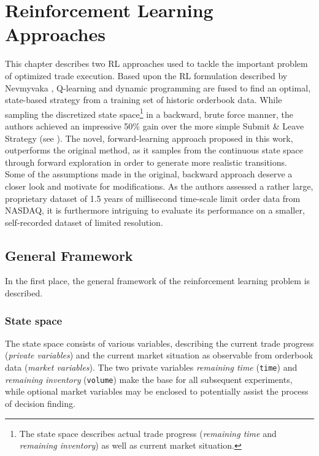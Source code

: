 \chapter{Reinforcement Learning Approaches}
\label{chap:reinforcementlearning}
This chapter describes two \ac{RL} approaches used to tackle the important problem of optimized trade execution. Based upon the \ac{RL} formulation described by Nevmyvaka \etal \cite{Nevmyvaka:2006}, Q-learning and dynamic programming are fused to find an optimal, state-based strategy from a training set of historic orderbook data. While sampling the discretized state space\footnote{The state space describes actual trade progress (\ie \emph{remaining time} and \emph{remaining inventory}) as well as current market situation.} in a backward, brute force manner, the authors achieved an impressive 50\% gain over the more simple Submit \& Leave Strategy (see ). The novel, forward-learning approach proposed in this work, outperforms the original method, as it samples from the continuous state space through forward exploration in order to generate more realistic transitions.\\

Some of the assumptions made in the original, backward approach deserve a closer look and motivate for modifications. As the authors assessed a rather large, proprietary dataset of 1.5 years of millisecond time-scale limit order data from \acs{NASDAQ}, it is furthermore intriguing to evaluate its performance on a smaller, self-recorded dataset of limited resolution.






\section{General Framework}
\label{chap:reinforcementlearning:original}
In the first place, the general framework of the reinforcement learning problem is described.


\subsection{State space}
\label{chap:statespace}
The state space consists of various variables, describing the current trade progress (\emph{private variables}) and the current market situation as observable from orderbook data (\emph{market variables}). The two private variables \emph{remaining time} (\lstinline!time!) and \emph{remaining inventory} (\lstinline!volume!) make the base for all subsequent experiments, while optional market variables may be enclosed to potentially assist the process of decision finding.\\


